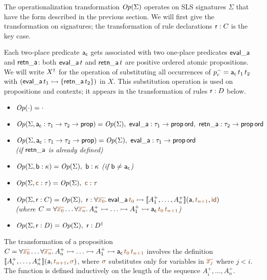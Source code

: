 The operationalization transformation ${\it Op}({\Sigma})$
operates on SLS signatures $\Sigma$ that have the form described in the
previous section. We
will first give the transformation on signatures; the transformation
of rule declarations ${\sf r} : C$ is the key case.

Each two-place predicate ${\sf a_c}$ gets associated with two
one-place
predicates ${\sf eval\_a}$ and ${\sf retn\_a}$: both ${\sf
  eval\_a}\,t$ and ${\sf retn\_a}\,t$ are positive ordered atomic
propositions. 
We will write ${{X}^\dag}$ for the operation of
substituting all occurrences of $p^-_c = {\sf a_c}\,t_1\,t_2$ with
$({\sf eval\_a}\,t_1 \rightarrowtail \{ {\sf retn\_a}\,t_2 \})$ in $X$. This
substitution operation is used on propositions and contexts;
it appears in the transformation of rules ${\sf r} : D$ below.

\smallskip
\begin{itemize}
\item ${\it Op}({\cdot}) = \cdot$
\item ${\it Op}({\Sigma, {\sf a_c} : \tau_1 \rightarrow \tau_2
    \rightarrow {\sf prop}}) = {\it Op}({\Sigma}), ~ {\sf eval\_a} :
  \tau_1 \rightarrow {\sf prop\,ord}, ~ {\sf retn\_a} : \tau_2
  \rightarrow {\sf prop\,ord}$ 
\item ${\it Op}({\Sigma, {\sf a_c} : \tau_1 \rightarrow \tau_2
    \rightarrow {\sf prop}}) = {\it Op}({\Sigma}), ~ {\sf eval\_a} :
  \tau_1 \rightarrow {\sf prop\,ord}$ \\
{\it (if ${\sf retn\_a}$ is already defined)}
\item ${\it Op}({\Sigma, {\sf b} : \kappa}) = {\it Op}({\Sigma}), ~ {\sf b}
  : \kappa$ {\it (if ${\sf b} \neq {\sf a_c}$)}
\item $\transop{\Sigma, \lf{\sf c} : \tau} = \transop{\Sigma}, ~ \lf{\sf
    c} : \tau$ 
\item $\transop{\Sigma, {\sf r} : C} = \transop{\Sigma}, ~ {\sf r}
  : \forall \lf{\overline{x_0}}.\, {\sf eval\_a}\,\lf{t_0} \lefti 
      \opbasic{A^+_1, \ldots, A^+_n}{\lf{t_{n+1}}}{\lf{\sf id}}$ \\ 
    {\it (where $C = \forall \lf{\overline{x_0}}\ldots \forall
    \lf{\overline{x_n}}.\, A^+_n \lefti \ldots \lefti A^+_1 \lefti {\sf
      a_c}\,\lf{t_{0}}\,\lf{t_{n+1}}$)}
\item ${\it Op}({\Sigma, {\sf r} : D}) = {\it Op}({\Sigma}), ~ {\sf r}
  : {{D}^\dag}$
\end{itemize}
\smallskip

The transformation of a proposition $C = \forall
\lf{\overline{x_0}}\ldots \forall \lf{\overline{x_n}}.\,A^+_n \lefti \ldots
\lefti A^+_1 \lefti {\sf a_c}\,\lf{t_{0}}\,\lf{t_{n+1}}$ involves the definition
$\opbasic{A^+_i,\ldots,A^+_n}{\lf{t_{n+1}}}{\lf{\sigma}}$, where $\lf\sigma$
substitutes only for variables in $\lf{\overline{x_j}}$ where $j < i$. The
function is defined inductively on the length of the sequence
$A^+_i,\ldots,A^+_n$.

